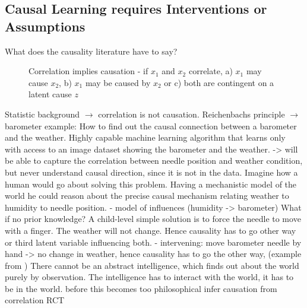 	\subsection{Causal Learning requires Interventions or Assumptions}
	What does the causality literature have to say?
	\begin{figure}[t]
		\begin{subfigure}{0.3\linewidth}
			\centering
			
			\caption{}
			\label{fig:s1}
		\end{subfigure}
		\begin{subfigure}{0.3\linewidth}
			\centering
			
			\caption{}
			\label{fig:s2}
		\end{subfigure}
		\begin{subfigure}{0.3\linewidth}
			\centering
			
			\caption{}
			\label{fig:s2}
		\end{subfigure}
		\caption{Correlation implies causation - if $x_1$ and $x_2$ correlate, a) $x_1$ may cause $x_2$,  b) $x_1$ may be caused by $x_2$ or c) both are contingent on a latent cause $z$}
		\label{fig:reichenbach}
	\end{figure}
	Statistic background $\rightarrow$ correlation is not causation.
	Reichenbachs principle \cite{reichenbach56time}
	$\rightarrow$ barometer example: How to find out the causal connection between a barometer and the weather. Highly capable machine learning algorithm that learns only with access to an image dataset showing the barometer and the weather. -> will be able to capture the correlation between needle position and weather condition, but never understand causal direction, since it is not in the data.
	Imagine how a human would go about solving this problem. Having a mechanistic model of the world he could reason about the precise causal mechanism relating weather to humidity to needle position.
	- model of influences (humidity -> barometer)
	What if no prior knowledge? A child-level simple solution is to force the needle to move with a finger. The weather will not change. Hence causality has to go other way or third latent variable influencing both.
	- intervening: move barometer needle by hand -> no change in weather, hence causality has to go the other way, (example from \cite{pearl18why})
	There cannot be an abstract intelligence, which finds out about the world purely by observation. The intelligence has to interact with the world, it has to be in the world.
	before this becomes too philosophical
	infer causation from correlation
	RCT

